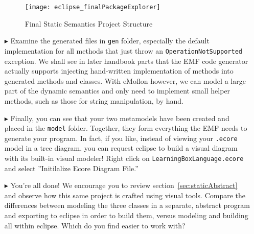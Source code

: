 \begin{itemize}
\begin{figure}[htbp]
	\centering
  \texttt{[image: eclipse\_finalPackageExplorer]}
	\caption{Final Static Semantics Project Structure}
	\label{fig:builtModel}
\end{figure}

\item[$\blacktriangleright$] Examine the generated files in \texttt{gen} folder, especially the default implementation for all methods that just throw an \texttt{OperationNotSupported} exception. We shall see in later handbook parts that the EMF code generator actually supports injecting hand-written implementation of methods into generated methods and classes. With eMoflon however, we can model a large part of the dynamic semantics and only need to implement small helper methods, such as those for string manipulation, by hand.

\item[$\blacktriangleright$] Finally, you can see that your two metamodels have been created and placed in the \texttt{model} folder. Together, they form everything the EMF needs to generate your program. In fact, if you like, instead of viewing your \texttt{.ecore} model in a tree diagram, you can request eclipse to build a visual diagram with its built-in visual modeler! Right click on \texttt{LearningBoxLanguage.ecore} and select ''Initilalize Ecore Diagram File.''


\item[$\blacktriangleright$] You're all done! We encourage you to review section~\ref{sec:staticAbstract} and observe how this same project is crafted using visual tools. Compare the differences between modeling the three classes in a separate, abstract program and exporting to eclipse in order to build them, versus modeling and building all within eclipse. Which do you find easier to work with?

\end{itemize}
